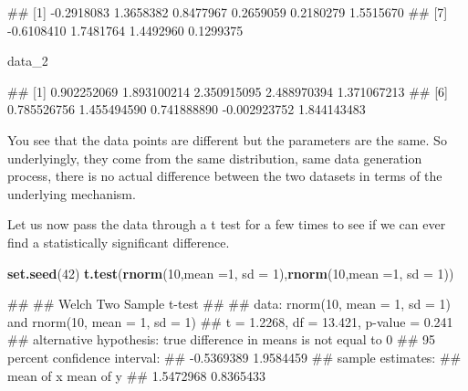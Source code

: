 \documentclass[
]{book}
\newenvironment{Shaded}{\begin{snugshade}}{\end{snugshade}}
\newcommand{\AttributeTok}[1]{\textcolor[rgb]{0.13,0.29,0.53}{#1}}
\newcommand{\DecValTok}[1]{\textcolor[rgb]{0.00,0.00,0.81}{#1}}
\newcommand{\FunctionTok}[1]{\textcolor[rgb]{0.13,0.29,0.53}{\textbf{#1}}}
\newcommand{\NormalTok}[1]{#1}
\begin{document}
\begin{Shaded}
\begin{Highlighting}[]
\NormalTok{\#\#  [1] {-}0.2918083  1.3658382  0.8477967  0.2659059  0.2180279  1.5515670}
\NormalTok{\#\#  [7] {-}0.6108410  1.7481764  1.4492960  0.1299375}
\end{Highlighting}
\end{Shaded}

\begin{Shaded}
\begin{Highlighting}[]
\NormalTok{data\_2}
\end{Highlighting}
\end{Shaded}

\begin{Shaded}
\begin{Highlighting}[]
\NormalTok{\#\#  [1]  0.902252069  1.893100214  2.350915095  2.488970394  1.371067213}
\NormalTok{\#\#  [6]  0.785526756  1.455494590  0.741888890 {-}0.002923752  1.844143483}
\end{Highlighting}
\end{Shaded}

You see that the data points are different but the parameters are the same. So underlyingly, they come from the same distribution, same data generation process, there is no actual difference between the two datasets in terms of the underlying mechanism.

Let us now pass the data through a t test for a few times to see if we can ever find a statistically significant difference.

\begin{Shaded}
\begin{Highlighting}[]
\FunctionTok{set.seed}\NormalTok{(}\DecValTok{42}\NormalTok{)}
\FunctionTok{t.test}\NormalTok{(}\FunctionTok{rnorm}\NormalTok{(}\DecValTok{10}\NormalTok{,}\AttributeTok{mean =}\DecValTok{1}\NormalTok{, }\AttributeTok{sd =} \DecValTok{1}\NormalTok{),}\FunctionTok{rnorm}\NormalTok{(}\DecValTok{10}\NormalTok{,}\AttributeTok{mean =}\DecValTok{1}\NormalTok{, }\AttributeTok{sd =} \DecValTok{1}\NormalTok{))}
\end{Highlighting}
\end{Shaded}

\begin{Shaded}
\begin{Highlighting}[]
\NormalTok{\#\# }
\NormalTok{\#\#  Welch Two Sample t{-}test}
\NormalTok{\#\# }
\NormalTok{\#\# data:  rnorm(10, mean = 1, sd = 1) and rnorm(10, mean = 1, sd = 1)}
\NormalTok{\#\# t = 1.2268, df = 13.421, p{-}value = 0.241}
\NormalTok{\#\# alternative hypothesis: true difference in means is not equal to 0}
\NormalTok{\#\# 95 percent confidence interval:}
\NormalTok{\#\#  {-}0.5369389  1.9584459}
\NormalTok{\#\# sample estimates:}
\NormalTok{\#\# mean of x mean of y }
\NormalTok{\#\# 1.5472968 0.8365433}
\end{Highlighting}
\end{Shaded}
\end{document}
